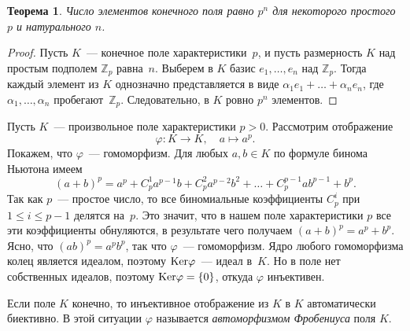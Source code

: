\documentclass[a4paper, 12pt]{article}
\def\Ker{{\rm Ker}}%
\def\ZZ{{\mathbb Z}}%
\newtheorem{theorem}{Теорема}
\theoremstyle{definition}
\theoremstyle{remark}
\begin{document}
\begin{theorem} \label{thm1}
Число элементов конечного поля равно $p^n$ для некоторого простого
$p$ и натурального $n$.
\end{theorem}

\begin{proof}
Пусть $K$~--- конечное поле характеристики~$p$, и пусть размерность
$K$ над простым подполем $\ZZ_p$ равна~$n$. Выберем в $K$ базис
$e_1, \ldots, e_n$ над $\ZZ_p$. Тогда каждый элемент из $K$
однозначно представляется в виде $\alpha_1 e_1 + \ldots + \alpha_n
e_n$, где $\alpha_1, \ldots, \alpha_n$ пробегают~$\ZZ_p$.
Следовательно, в $K$ ровно $p^n$ элементов.
\end{proof}

Пусть $K$~--- произвольное поле характеристики $p > 0$. Рассмотрим
отображение
$$
\varphi \colon K \to K, \quad a \mapsto a^p.
$$
Покажем, что $\varphi$~--- гомоморфизм. Для любых $a,b \in K$ по
формуле бинома Ньютона имеем
$$
(a + b)^p = a^p + C_p^1 a^{p-1}b + C_p^2 a^{p-2}b^2 + \ldots +
C_p^{p-1} a b^{p-1} + b^p.
$$
Так как $p$~--- простое число, то все биномиальные коэффициенты
$C_p^i$ при $1 \leqslant i \leqslant p-1$ делятся на~$p$. Это
значит, что в нашем поле характеристики $p$ все эти коэффициенты
обнуляются, в результате чего получаем $(a + b)^p = a^p + b^p$.
Ясно, что $(ab)^p = a^p b^p$, так что $\varphi$~--- гомоморфизм.
Ядро любого гомоморфизма колец является идеалом, поэтому $\Ker
\varphi$~--- идеал в~$K$. Но в поле нет собственных идеалов, поэтому
$\Ker \varphi = \lbrace 0 \rbrace$, откуда $\varphi$ инъективен.

Если поле $K$ конечно, то инъективное отображение из $K$ в $K$
автоматически биективно. В этой ситуации $\varphi$ называется {\it
автоморфизмом Фробениуса} поля $K$.
\end{document}
